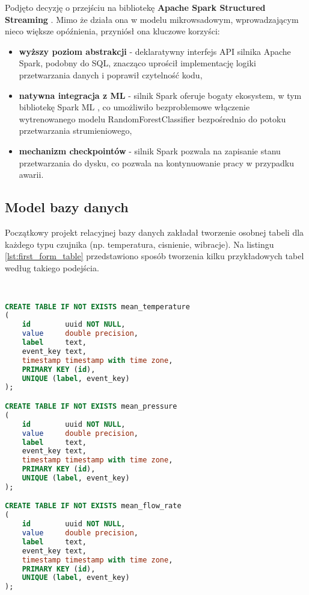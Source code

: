 Podjęto decyzję o przejściu na bibliotekę \textbf{Apache Spark Structured Streaming} \cite{spark_streaming}. Mimo że działa ona w modelu mikrowsadowym, wprowadzającym nieco większe opóźnienia, przyniósł ona kluczowe korzyści:
\begin{itemize}
    \item \textbf{wyższy poziom abstrakcji} - deklaratywny interfejs API silnika Apache Spark, podobny do SQL, znacząco uprościł implementację logiki przetwarzania danych i poprawił czytelność kodu,
    \item \textbf{natywna integracja z ML} - silnik Spark oferuje bogaty ekosystem, w tym bibliotekę Spark ML \cite{spark_streaming}, co umożliwiło bezproblemowe włączenie wytrenowanego modelu RandomForestClassifier bezpośrednio do potoku przetwarzania strumieniowego,
    \item \textbf{mechanizm checkpointów} - silnik Spark pozwala na zapisanie stanu przetwarzania do dysku, co pozwala na kontynuowanie pracy w przypadku awarii.
\end{itemize}

\newpage

\subsection{Model bazy danych}

Początkowy projekt relacyjnej bazy danych zakładał tworzenie osobnej tabeli dla każdego typu czujnika (np. temperatura, cisnienie, wibracje). Na listingu \ref{lst:first_form_table} przedstawiono sposób tworzenia kilku przykładowych tabel według takiego podejścia.

\begin{lstlisting}[caption={Pierwsza forma tabeli w relacyjnej bazie danych}, label={lst:first_form_table},language=SQL]


CREATE TABLE IF NOT EXISTS mean_temperature
(
    id        uuid NOT NULL,
    value     double precision,
    label     text,
    event_key text,
    timestamp timestamp with time zone,
    PRIMARY KEY (id),
    UNIQUE (label, event_key)
);

CREATE TABLE IF NOT EXISTS mean_pressure
(
    id        uuid NOT NULL,
    value     double precision,
    label     text,
    event_key text,
    timestamp timestamp with time zone,
    PRIMARY KEY (id),
    UNIQUE (label, event_key)
);

CREATE TABLE IF NOT EXISTS mean_flow_rate
(
    id        uuid NOT NULL,
    value     double precision,
    label     text,
    event_key text,
    timestamp timestamp with time zone,
    PRIMARY KEY (id),
    UNIQUE (label, event_key)
);

\end{lstlisting}

